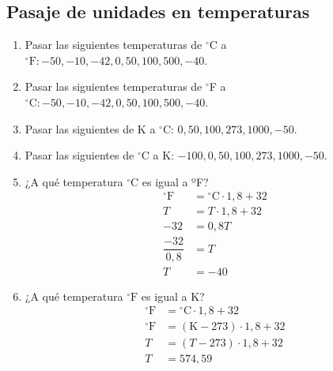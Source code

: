 \subsection*{Pasaje de unidades en temperaturas}

\begin{enumerate}
\item Pasar las siguientes temperaturas de $^\circ$C a $^\circ\text{F}: -50, -10, -42, 0, 50, 100, 500, -40$.

\item Pasar las siguientes temperaturas de $^\circ$F a $^\circ\text{C}: -50, -10, -42, 0, 50, 100, 500, -40$.

\item Pasar las siguientes de K a $^\circ$C: $0, 50, 100, 273, 1000, -50$.

\item Pasar las siguientes de $^\circ$C a K: $-100, 0, 50, 100, 273, 1000, -50$.

\item ¿A qué temperatura $\text{$^\circ$C}$ es igual a ºF?
\begin{align*}
    ^\circ\text{F}&= \text{$^\circ$C} \cdot 1,8 + 32\\
    T &= T \cdot 1,8 + 32\\
    -32 &= 0,8 T\\
    \dfrac{-32}{0,8} &= T\\
    T &= -40
\end{align*}

\item ¿A qué temperatura $\text{$^\circ$F}$ es igual a K?
\begin{align*}
    ^\circ\text{F}&= \text{$^\circ$C} \cdot 1,8 + 32\\
    ^\circ\text{F}&= (\text{K}-273) \cdot 1,8 + 32\\
    T&= (T-273) \cdot 1,8 + 32\\
    T &= 574,59
\end{align*}
\end{enumerate}
